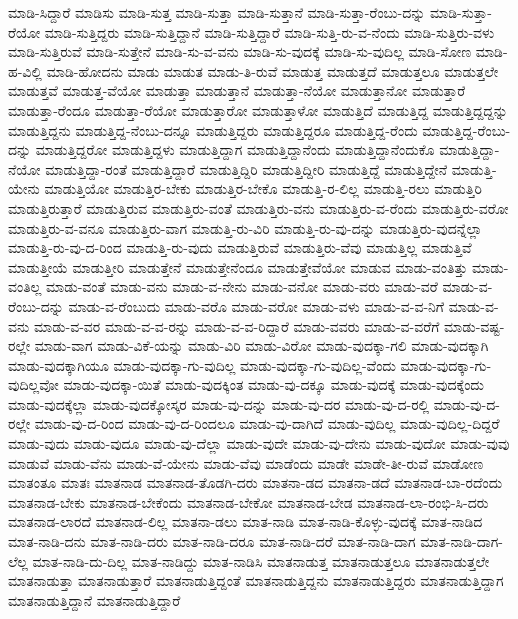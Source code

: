 {ಮಾಡಿ-ಸಿದ್ದಾರೆ
ಮಾಡಿಸು
ಮಾಡಿ-ಸುತ್ತ
ಮಾಡಿ-ಸುತ್ತಾ
ಮಾಡಿ-ಸುತ್ತಾನೆ
ಮಾಡಿ-ಸುತ್ತಾ-ರೆಂಬು-ದನ್ನು
ಮಾಡಿ-ಸುತ್ತಾ-ರೆಯೋ
ಮಾಡಿ-ಸುತ್ತಿದ್ದರು
ಮಾಡಿ-ಸುತ್ತಿದ್ದಾನೆ
ಮಾಡಿ-ಸುತ್ತಿದ್ದಾರೆ
ಮಾಡಿ-ಸುತ್ತಿ-ರು-ವ-ನೆಂದು
ಮಾಡಿ-ಸುತ್ತಿರು-ವಳು
ಮಾಡಿ-ಸುತ್ತಿರುವೆ
ಮಾಡಿ-ಸುತ್ತೇನೆ
ಮಾಡಿ-ಸು-ವ-ವನು
ಮಾಡಿ-ಸು-ವುದಕ್ಕೆ
ಮಾಡಿ-ಸು-ವುದಿಲ್ಲ
ಮಾಡಿ-ಸೋಣ
ಮಾಡಿ-ಹ-ವಿಲ್ಲಿ
ಮಾಡಿ-ಹೋದನು
ಮಾಡು
ಮಾಡುತ
ಮಾಡು-ತಿ-ರುವೆ
ಮಾಡುತ್ತ
ಮಾಡುತ್ತದೆ
ಮಾಡುತ್ತಲೂ
ಮಾಡುತ್ತಲೇ
ಮಾಡುತ್ತವೆ
ಮಾಡುತ್ತ-ವೆಯೋ
ಮಾಡುತ್ತಾ
ಮಾಡುತ್ತಾನೆ
ಮಾಡುತ್ತಾ-ನೆಯೋ
ಮಾಡುತ್ತಾನೋ
ಮಾಡುತ್ತಾರೆ
ಮಾಡುತ್ತಾ-ರೆಂದೂ
ಮಾಡುತ್ತಾ-ರೆಯೋ
ಮಾಡುತ್ತಾರೋ
ಮಾಡುತ್ತಾಳೋ
ಮಾಡುತ್ತಿದೆ
ಮಾಡುತ್ತಿದ್ದ
ಮಾಡುತ್ತಿದ್ದದ್ದನ್ನು
ಮಾಡುತ್ತಿದ್ದನು
ಮಾಡುತ್ತಿದ್ದ-ನೆಂಬು-ದನ್ನೂ
ಮಾಡುತ್ತಿದ್ದರು
ಮಾಡುತ್ತಿದ್ದರೂ
ಮಾಡುತ್ತಿದ್ದ-ರೆಂದು
ಮಾಡುತ್ತಿದ್ದ-ರೆಂಬು-ದನ್ನು
ಮಾಡುತ್ತಿದ್ದರೋ
ಮಾಡುತ್ತಿದ್ದಳು
ಮಾಡುತ್ತಿದ್ದಾಗ
ಮಾಡುತ್ತಿದ್ದಾನೆಂದು
ಮಾಡುತ್ತಿದ್ದಾನೆಂದುಕೊ
ಮಾಡುತ್ತಿದ್ದಾ-ನೆಯೋ
ಮಾಡುತ್ತಿದ್ದಾ-ರಂತೆ
ಮಾಡುತ್ತಿದ್ದಾರೆ
ಮಾಡುತ್ತಿದ್ದಿರಿ
ಮಾಡುತ್ತಿದ್ದೀರಿ
ಮಾಡುತ್ತಿದ್ದೆ
ಮಾಡುತ್ತಿದ್ದೇನೆ
ಮಾಡುತ್ತಿ-ಯೇನು
ಮಾಡುತ್ತಿಯೋ
ಮಾಡುತ್ತಿರ-ಬೇಕು
ಮಾಡುತ್ತಿರ-ಬೇಕೊ
ಮಾಡುತ್ತಿ-ರ-ಲಿಲ್ಲ
ಮಾಡುತ್ತಿ-ರಲು
ಮಾಡುತ್ತಿರಿ
ಮಾಡುತ್ತಿರುತ್ತಾರೆ
ಮಾಡುತ್ತಿರುವ
ಮಾಡುತ್ತಿರು-ವಂತೆ
ಮಾಡುತ್ತಿರು-ವನು
ಮಾಡುತ್ತಿರು-ವ-ರೆಂದು
ಮಾಡುತ್ತಿರು-ವರೋ
ಮಾಡುತ್ತಿರು-ವ-ವನೂ
ಮಾಡುತ್ತಿರು-ವಾಗ
ಮಾಡುತ್ತಿ-ರು-ವಿರಿ
ಮಾಡುತ್ತಿ-ರು-ವು-ದನ್ನು
ಮಾಡುತ್ತಿರು-ವುದನ್ನೆಲ್ಲಾ
ಮಾಡುತ್ತಿ-ರು-ವು-ದ-ರಿಂದ
ಮಾಡುತ್ತಿ-ರು-ವುದು
ಮಾಡುತ್ತಿರುವೆ
ಮಾಡುತ್ತಿರು-ವೆವು
ಮಾಡುತ್ತಿಲ್ಲ
ಮಾಡುತ್ತಿವೆ
ಮಾಡುತ್ತೀಯೆ
ಮಾಡುತ್ತೀರಿ
ಮಾಡುತ್ತೇನೆ
ಮಾಡುತ್ತೇನೆಂದೂ
ಮಾಡುತ್ತೇವೆಯೋ
ಮಾಡುವ
ಮಾಡು-ವಂತಿತ್ತು
ಮಾಡು-ವಂತಿಲ್ಲ
ಮಾಡು-ವಂತೆ
ಮಾಡು-ವನು
ಮಾಡು-ವ-ನೇನು
ಮಾಡು-ವನೋ
ಮಾಡು-ವರು
ಮಾಡು-ವರೆ
ಮಾಡು-ವ-ರೆಂಬು-ದನ್ನು
ಮಾಡು-ವ-ರೆಂಬುದು
ಮಾಡು-ವರೊ
ಮಾಡು-ವರೋ
ಮಾಡು-ವಳು
ಮಾಡು-ವ-ವ-ನಿಗೆ
ಮಾಡು-ವ-ವನು
ಮಾಡು-ವ-ವರ
ಮಾಡು-ವ-ವ-ರನ್ನು
ಮಾಡು-ವ-ವ-ರಿದ್ದಾರೆ
ಮಾಡು-ವವರು
ಮಾಡು-ವ-ವರೆಗೆ
ಮಾಡು-ವಷ್ಟ-ರಲ್ಲೇ
ಮಾಡು-ವಾಗ
ಮಾಡು-ವಿಕೆ-ಯನ್ನು
ಮಾಡು-ವಿರಿ
ಮಾಡು-ವಿರೋ
ಮಾಡು-ವುದಕ್ಕಾ-ಗಲಿ
ಮಾಡು-ವುದಕ್ಕಾಗಿ
ಮಾಡು-ವುದಕ್ಕಾಗಿಯೂ
ಮಾಡು-ವುದಕ್ಕಾ-ಗು-ವುದಿಲ್ಲ
ಮಾಡು-ವುದಕ್ಕಾ-ಗು-ವುದಿಲ್ಲ-ವೆಂದು
ಮಾಡು-ವುದಕ್ಕಾ-ಗು-ವುದಿಲ್ಲವೋ
ಮಾಡು-ವುದಕ್ಕಾ-ಯಿತೆ
ಮಾಡು-ವುದಕ್ಕಿಂತ
ಮಾಡು-ವು-ದಕ್ಕೂ
ಮಾಡು-ವುದಕ್ಕೆ
ಮಾಡು-ವುದಕ್ಕೆಂದು
ಮಾಡು-ವುದಕ್ಕೆಲ್ಲಾ
ಮಾಡು-ವುದಕ್ಕೋಸ್ಕರ
ಮಾಡು-ವು-ದನ್ನು
ಮಾಡು-ವು-ದರ
ಮಾಡು-ವು-ದ-ರಲ್ಲಿ
ಮಾಡು-ವು-ದ-ರಲ್ಲೇ
ಮಾಡು-ವು-ದ-ರಿಂದ
ಮಾಡು-ವು-ದ-ರಿಂದಲೂ
ಮಾಡು-ವು-ದಾಗಿದೆ
ಮಾಡು-ವುದಿಲ್ಲ
ಮಾಡು-ವುದಿಲ್ಲ-ದಿದ್ದರೆ
ಮಾಡು-ವುದು
ಮಾಡು-ವುದೂ
ಮಾಡು-ವು-ದೆಲ್ಲಾ
ಮಾಡು-ವುದೇ
ಮಾಡು-ವು-ದೇನು
ಮಾಡು-ವುದೋ
ಮಾಡು-ವುವು
ಮಾಡುವೆ
ಮಾಡು-ವೆನು
ಮಾಡು-ವೆ-ಯೇನು
ಮಾಡು-ವೆವು
ಮಾಡೆಂದು
ಮಾಡೇ
ಮಾಡೇ-ತೀ-ರುವೆ
ಮಾಡೋಣ
ಮಾತಂತೂ
ಮಾತಃ
ಮಾತನಾಡ
ಮಾತನಾಡ-ತೊಡಗಿ-ದರು
ಮಾತನಾ-ಡದ
ಮಾತನಾ-ಡದೆ
ಮಾತನಾಡ-ಬಾ-ರದೆಂದು
ಮಾತನಾಡ-ಬೇಕು
ಮಾತನಾಡ-ಬೇಕೆಂದು
ಮಾತನಾಡ-ಬೇಕೋ
ಮಾತನಾಡ-ಬೇಡ
ಮಾತನಾಡ-ಲಾ-ರಂಭಿ-ಸಿ-ದರು
ಮಾತನಾಡ-ಲಾರದೆ
ಮಾತನಾಡ-ಲಿಲ್ಲ
ಮಾತನಾ-ಡಲು
ಮಾತ-ನಾಡಿ
ಮಾತ-ನಾಡಿ-ಕೊಳ್ಳು-ವುದಕ್ಕೆ
ಮಾತ-ನಾಡಿದ
ಮಾತ-ನಾಡಿ-ದನು
ಮಾತ-ನಾಡಿ-ದರು
ಮಾತ-ನಾಡಿ-ದರೂ
ಮಾತ-ನಾಡಿ-ದರೆ
ಮಾತ-ನಾಡಿ-ದಾಗ
ಮಾತ-ನಾಡಿ-ದಾಗ-ಲೆಲ್ಲ
ಮಾತ-ನಾಡಿ-ದು-ದಿಲ್ಲ
ಮಾತ-ನಾಡಿದ್ದು
ಮಾತ-ನಾಡಿಸಿ
ಮಾತನಾಡುತ್ತ
ಮಾತನಾಡುತ್ತಲೂ
ಮಾತನಾಡುತ್ತಲೇ
ಮಾತನಾಡುತ್ತಾ
ಮಾತನಾಡುತ್ತಾರೆ
ಮಾತನಾಡುತ್ತಿದ್ದಂತೆ
ಮಾತನಾಡುತ್ತಿದ್ದನು
ಮಾತನಾಡುತ್ತಿದ್ದರು
ಮಾತನಾಡುತ್ತಿದ್ದಾಗ
ಮಾತನಾಡುತ್ತಿದ್ದಾನೆ
ಮಾತನಾಡುತ್ತಿದ್ದಾರೆ
}
